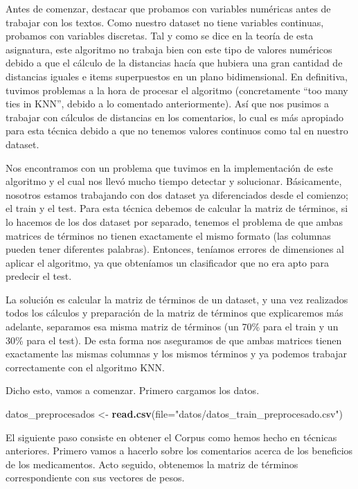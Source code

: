 \documentclass[spanish,]{article}
\newenvironment{Shaded}{\begin{snugshade}}{\end{snugshade}}
\newcommand{\KeywordTok}[1]{\textcolor[rgb]{0.13,0.29,0.53}{\textbf{#1}}}
\newcommand{\DataTypeTok}[1]{\textcolor[rgb]{0.13,0.29,0.53}{#1}}
\newcommand{\StringTok}[1]{\textcolor[rgb]{0.31,0.60,0.02}{#1}}
\newcommand{\NormalTok}[1]{#1}
\begin{document}
Antes de comenzar, destacar que probamos con variables numéricas antes
de trabajar con los textos. Como nuestro dataset no tiene variables
continuas, probamos con variables discretas. Tal y como se dice en la
teoría de esta asignatura, este algoritmo no trabaja bien con este tipo
de valores numéricos debido a que el cálculo de la distancias hacía que
hubiera una gran cantidad de distancias iguales e items superpuestos en
un plano bidimensional. En definitiva, tuvimos problemas a la hora de
procesar el algoritmo (concretamente ``too many ties in KNN'', debido a
lo comentado anteriormente). Así que nos pusimos a trabajar con cálculos
de distancias en los comentarios, lo cual es más apropiado para esta
técnica debido a que no tenemos valores continuos como tal en nuestro
dataset.

Nos encontramos con un problema que tuvimos en la implementación de este
algoritmo y el cual nos llevó mucho tiempo detectar y solucionar.
Básicamente, nosotros estamos trabajando con dos dataset ya
diferenciados desde el comienzo; el train y el test. Para esta técnica
debemos de calcular la matriz de términos, si lo hacemos de los dos
dataset por separado, tenemos el problema de que ambas matrices de
términos no tienen exactamente el mismo formato (las columnas pueden
tener diferentes palabras). Entonces, teníamos errores de dimensiones al
aplicar el algoritmo, ya que obteníamos un clasificador que no era apto
para predecir el test.

La solución es calcular la matriz de términos de un dataset, y una vez
realizados todos los cálculos y preparación de la matriz de términos que
explicaremos más adelante, separamos esa misma matriz de términos (un
70\% para el train y un 30\% para el test). De esta forma nos aseguramos
de que ambas matrices tienen exactamente las mismas columnas y los
mismos términos y ya podemos trabajar correctamente con el algoritmo
KNN.

Dicho esto, vamos a comenzar. Primero cargamos los datos.

\begin{Shaded}
\begin{Highlighting}[]
\NormalTok{datos_preprocesados <-}\StringTok{ }\KeywordTok{read.csv}\NormalTok{(}\DataTypeTok{file=}\StringTok{"datos/datos_train_preprocesado.csv"}\NormalTok{)}
\end{Highlighting}
\end{Shaded}

El siguiente paso consiste en obtener el Corpus como hemos hecho en
técnicas anteriores. Primero vamos a hacerlo sobre los comentarios
acerca de los beneficios de los medicamentos. Acto seguido, obtenemos la
matriz de términos correspondiente con sus vectores de pesos.
\end{document}
